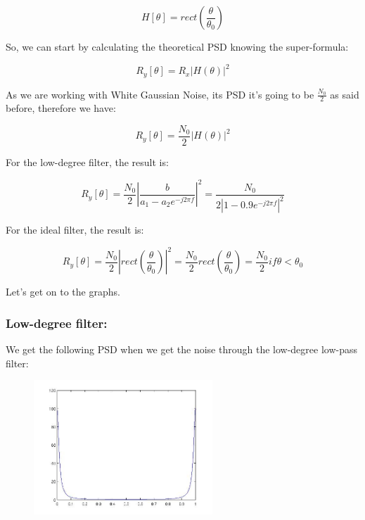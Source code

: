 \documentclass[a4paper,11pt]{article}
\begin{document}
\begin{equation}H[\theta] = rect(\frac{\theta}{\theta_0})\end{equation}

So, we can start by calculating the theoretical PSD knowing the super-formula:

\begin{equation}R_y[\theta] = R_x|H(\theta)|^2\end{equation} 

\newpage

As we are working with White Gaussian Noise, its PSD it's going to be $\frac{N_0}{2}$ as said before, therefore we have:

\begin{equation}R_y[\theta] = \frac{N_0}{2}|H(\theta)|^2\end{equation} 

For the low-degree filter, the result is:

\begin{equation}R_y[\theta] = \frac{N_0}{2}|\frac{b}{a_1-a_2e^{-j2 \pi f}}|^2 = \frac{N_0}{2|1-0.9e^{-j2 \pi f}|^2} \end{equation} 

For the ideal filter, the result is:

\begin{equation}R_y[\theta] = \frac{N_0}{2}|rect(\frac{\theta}{\theta_0})|^2 = \frac{N_0}{2}rect(\frac{\theta}{\theta_0}) = \frac{N_0}{2} if \theta < \theta_0 \end{equation} 

Let's get on to the graphs.

\newpage

\subsubsection{Low-degree filter:}

We get the following PSD when we get the noise through the low-degree low-pass filter:

\begin{figure}[!hp]
    \begin{center}
    \includegraphics[width=0.6\textwidth]{images/lab1_redo_figure3.jpg}
    \end{center}
\end{figure}
\end{document}
